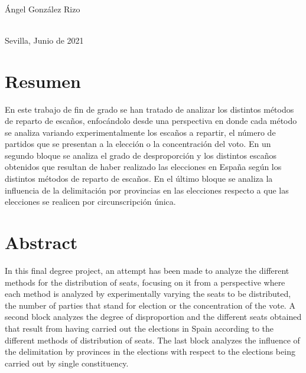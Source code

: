 \documentclass[12pt,a4paper,]{book}
\def\ifdoblecara{} %
\numberwithin{dummy}{section}
\theoremstyle{ocrenumbox}
\theoremstyle{blacknumex}
\theoremstyle{blacknumbox}
\theoremstyle{ocrenum}
\theoremstyle{ocrenum}
\begin{document}
\begin{titlepage}
\begin{minipage}{14cm}
\HRule \\[4cm]


{\Large

Ángel González Rizo} \\[0.5cm]

{\large
Sevilla, Junio de 2021
}

\end{minipage}

\vfill %

\cleardoublepage
\thispagestyle{empty}
\end{titlepage}

\raggedbottom


\setlength{\parindent}{1em}

\pagestyle{fancy}
\ifdefined\ifdoblecara
\fancyhead[LE,RO]{}
\fancyhead[LO,RE]{}
\else
\fancyhead[RO]{}
\fancyhead[LO]{}
\fi
\renewcommand{\headrulewidth}{0pt}
\renewcommand{\footrulewidth}{0pt}

\setcounter{tocdepth}{2}
\tableofcontents

\cleardoublepage

\section*{Resumen}

En este trabajo de fin de grado se han tratado de analizar los distintos
métodos de reparto de escaños, enfocándolo desde una perspectiva en
donde cada método se analiza variando experimentalmente los escaños a
repartir, el número de partidos que se presentan a la elección o la
concentración del voto. En un segundo bloque se analiza el grado de
desproporción y los distintos escaños obtenidos que resultan de haber
realizado las elecciones en España según los distintos métodos de
reparto de escaños. En el último bloque se analiza la influencia de la
delimitación por provincias en las elecciones respecto a que las
elecciones se realicen por circunscripción única.

\clearpage
\section*{Abstract}

In this final degree project, an attempt has been made to analyze the
different methods for the distribution of seats, focusing on it from a
perspective where each method is analyzed by experimentally varying the
seats to be distributed, the number of parties that stand for election
or the concentration of the vote. A second block analyzes the degree of
disproportion and the different seats obtained that result from having
carried out the elections in Spain according to the different methods of
distribution of seats. The last block analyzes the influence of the
delimitation by provinces in the elections with respect to the elections
being carried out by single constituency.
\end{document}
